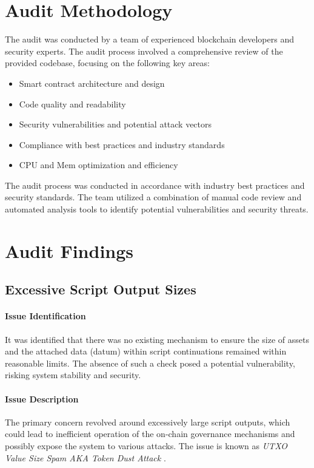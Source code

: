 \documentclass[11pt]{article}
\begin{document}
\section{Audit Methodology}
The audit was conducted by a team of experienced blockchain developers and security experts.
The audit process involved a comprehensive review of the provided codebase, focusing on the following key areas:

\begin{itemize}
    \item Smart contract architecture and design
    \item Code quality and readability
    \item Security vulnerabilities and potential attack vectors
    \item Compliance with best practices and industry standards
    \item CPU and Mem optimization and efficiency
\end{itemize}

The audit process was conducted in accordance with industry best practices and security standards.
The team utilized a combination of manual code review and automated analysis tools to identify potential vulnerabilities and security threats.

\section{Audit Findings}

\subsection{Excessive Script Output Sizes}

\paragraph{Issue Identification}
It was identified that there was no existing mechanism to ensure the size of assets and the attached data (datum) within script continuations remained within reasonable limits. The absence of such a check posed a potential vulnerability, risking system stability and security.

\paragraph{Issue Description}
The primary concern revolved around excessively large script outputs, which could lead to inefficient operation of the on-chain governance mechanisms and possibly expose the system to various attacks. The issue is known as \textit{UTXO Value Size Spam AKA Token Dust Attack} \cite{CommonVuls}.
\end{document}
